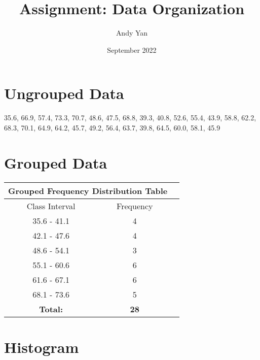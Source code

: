 \documentclass{article}
\title{Assignment: Data Organization}
\author{Andy Yan}
\date{September 2022}
\begin{document}
\maketitle

\section{Ungrouped Data}
35.6,  66.9,  57.4,  73.3,  70.7,  48.6,  47.5,  68.8,  39.3,  40.8,  52.6,  55.4,  43.9,  58.8,
62.2,  68.3,  70.1,  64.9,  64.2,  45.7,  49.2,  56.4,  63.7,  39.8,  64.5,  60.0,  58.1,  45.9

\section{Grouped Data}
\begin{center}
\def\arraystretch{1}
{\setlength{\tabcolsep}{5em}
\begin{tabular}{| c | c | c |} 
\hline
\multicolumn{2}{|c|}{Grouped Frequency Distribution Table} \\
 \hline
   Class Interval & Frequency\\ [1ex] 
 \hline
35.6 - 41.1 & 4\\
 \hline
42.1 - 47.6	& 4\\
 \hline
48.6 - 54.1	& 3\\
 \hline
55.1 - 60.6	& 6\\
 \hline
61.6 - 67.1	& 6\\
 \hline
 68.1 - 73.6	& 5\\
 \hline
  \textbf{Total:} & \textbf{28}\\
  \hline
\end{tabular}}
\end{center}

\section{Histogram}
\begin{center}
\end{center}
\end{document}
